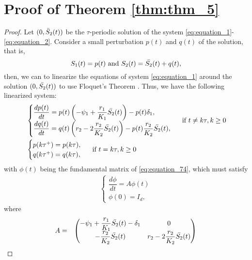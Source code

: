 \documentclass[10pt,letterpaper]{article}
\begin{document}
\section{Proof of Theorem \eqref{thm:thm_5}} 
\label{appendix:C}

\begin{proof}
Let $(0,\Bar{S}_2(t))$ be the $\tau$-periodic solution of the system \eqref{eq:equation_1}-\eqref{eq:equation_2}. Consider a small perturbation $p(t)$ and $q(t)$ of the solution, that is,
\begin{equation}\label{eq:equation_73}
    S_1(t) = p(t) \mbox{ and } S_2(t) = \Bar{S_2}(t) + q(t),
\end{equation}
then, we can to linearize the equations of system \eqref{eq:equation_1} around the solution $(0,\Bar{S_2}(t))$ to use Floquet's Theorem \cite{Bainov1993}. Thus, we have the following linearized system:
\begin{subequations}
\begin{align}
&\left.
\begin{cases}\label{eq:equation_74}
       \dfrac{dp(t)}{dt} =p(t)\left( -\psi_1+\dfrac{r_1}{K_1}\Bar{S_2}(t)\right)-p(t)\delta_1,\\
       \dfrac{dq(t)}{dt} =q(t)\left( r_2-2\dfrac{r_2}{K_2}\Bar{S_2}(t) \right) -p(t)\dfrac{r_2}{K_2}\Bar{S_2}(t),
\end{cases}
\right.\mbox{ if } t \neq k\tau, k \geq 0\\
&\left.
\begin{cases}\label{eq:equation_75}  
        p(k\tau^+) = p(k\tau), \\
        q(k\tau^+) = q(k\tau),
\end{cases}
\right.\mbox{ if } t = k\tau, k \geq 0
\end{align}
\end{subequations}
with $\phi(t)$ being the fundamental matrix of \eqref{eq:equation_74}, which must satisfy 
\begin{align}\label{eq:equation_76}
\begin{cases}
\dfrac{d\phi}{dt} = A\phi(t)\\
\phi(0) = I_d,
\end{cases}
\end{align}
where 
\begin{eqnarray}\label{eq:equation_77}
A&=& \begin{pmatrix}
-\psi_1+\dfrac{r_1}{K_1}\Bar{S_2}(t)-\delta_1 & 0  \\
-\dfrac{r_2}{K_2}\Bar{S_2}(t) & r_2-2\dfrac{r_2}{K_2}\Bar{S_2}(t)\\

\end{pmatrix}
\end{eqnarray}
\end{proof}
\end{document}
